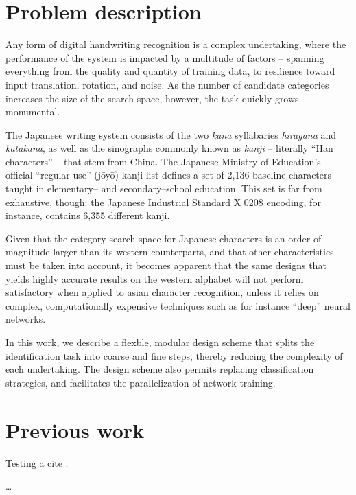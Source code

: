 \documentclass[10pt,conference,a4paper]{IEEEtran}
\begin{document}
	\section{Problem description}

	Any form of digital handwriting recognition is a complex undertaking,
	where the performance of the system is impacted by a multitude of factors -- spanning
	everything from the quality and quantity of training data, to resilience toward input
	translation, rotation, and noise. As the number of candidate categories increases
	the size of the search space, however, the task quickly grows monumental.

	The Japanese writing system consists of the two \emph{kana} syllabaries \emph{hiragana} and \emph{katakana},
	as well as the sinographs commonly known as \emph{kanji} -- literally ``Han characters'' -- that stem from China.
	The Japanese Ministry of Education's official ``regular use'' (j\=oy\=o) kanji list defines a set of 2,136
	baseline characters taught in elementary-- and secondary--school education. \cite{hadamitzky2012japanese}
	This set is far from exhaustive, though: the Japanese Industrial Standard X 0208 encoding, for instance, contains 6,355 different kanji.

	Given that the category search space for Japanese characters is an order of magnitude larger than its western counterparts,
	and that other characteristics must be taken into account, it becomes apparent that the same designs that
	yields highly accurate results on the western alphabet will not perform satisfactory when applied to asian character recognition, \cite{tappert1990state}
	unless it relies on complex, computationally expensive techniques such as for instance ``deep'' neural networks. \cite{ciresan2012multi}

	In this work, we describe a flexble, modular design scheme that splits the identification task into coarse and fine steps,
	thereby reducing the complexity of each undertaking. The design scheme also permits replacing classification strategies,
	and facilitates the parallelization of network training.


	 
	\section{Previous work}

	Testing a cite \cite{zhu2014robust}.

	\ldots
\end{document}
